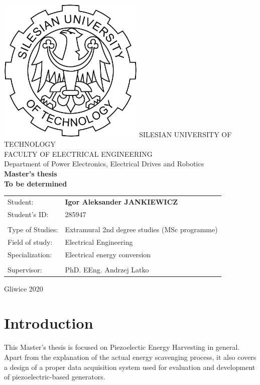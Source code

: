 \documentclass[12pt,a4paper]{article}
\begin{document}
\begin{titlepage}
    \centering
    \includegraphics[width=7cm]{logo.jpg} %
    \vskip1cm
    {\Large
        SILESIAN UNIVERSITY OF TECHNOLOGY\\
        FACULTY OF ELECTRICAL ENGINEERING\\
        \vskip0.5cm
        Department of Power Electronics, Electrical Drives and Robotics\\
    }
    \vskip1cm
    {\bfseries\huge
    Master's thesis\\
    }
    \vskip1cm
    {\bfseries\large
    To be determined \\
    }
    \vskip2cm
    {\large
    \begin{tabular}{p{4cm} p{10cm}}
    Student: & {\bfseries\Large Igor Aleksander JANKIEWICZ}\\
    Student's ID: & 285947\\
        &   \\
    Type of Studies: & Extramural 2nd degree studies (MSc programme)\\
    Field of study: & Electrical Engineering\\
    Specialization: & Electrical energy conversion\\
        &   \\
    Supervisor: & PhD. EEng. Andrzej Latko\\
    \end{tabular}
    }
    \vskip2.5cm
    {\large
    Gliwice 2020}
\end{titlepage}
\newpage\null\thispagestyle{empty}\newpage
\tableofcontents
\newpage\null\thispagestyle{empty}

\section{Introduction}
This Master's thesis is focused on Piezoelectic Energy Harvesting in general. Apart from the explanation of the actual energy scavenging process, it also covers a design of a proper data acquisition system used for evaluation and development of piezoelectric-based generators.
\par
\end{document}
